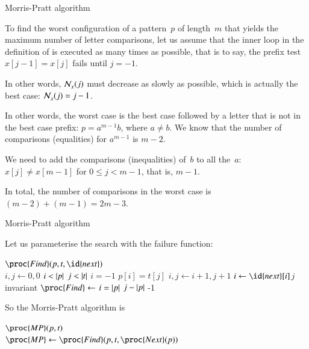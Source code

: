 %
\begin{frame}{Morris-Pratt algorithm}

  To find the worst configuration of a pattern~\(p\) of length~\(m\)
  that yields the maximum number of letter comparisons, let us assume
  that the inner loop in the definition of  is executed as
  many times as possible, that is to say, the prefix test \(x[j-1] =
  x[j]\) fails until \(j = -1\).

  \bigskip

  In other words, \(\mathcal{N}_{x}^{}(j)\) must decrease as slowly as
  possible, which is actually the best case: \(\mathcal{N}_{x}^{}(j) = j
  - 1\).

  \bigskip

  In other words, the worst case is the best case followed by a letter
  that is not in the best case prefix: \(p = a^{m-1}b\), where \(a
  \neq b\). We know that the number of comparisons (equalities) for \(a^{m-1}\) is \(m-2\).

  \bigskip

  We need to add the comparisons (inequalities) of~\(b\) to all
  the~\(a\): \(x[j] \neq x[m-1]\) for \(0 \leqslant j < m - 1\), that
  is, \(m - 1\).

  \bigskip

  In total, the number of comparisons in the worst case is
  \((m-2)+(m-1) = 2m-3\).

\end{frame}

%
\begin{frame}{Morris-Pratt algorithm}

Let us parameterise the search with the failure function:
\begin{codebox}
\(\proc{Find} (p, t, \id{next})\)\\
\li \(i, j \gets 0, 0\)
\li \While \(i < \left\lvert\smash{p}\right\rvert\) \LogAnd \(j < \left\lvert\smash{t}\right\rvert\) 
\li \> \If \(i = -1\) \LogOr \(p[i] = t[j]\)
\li    \Then \(i, j \gets i + 1, j + 1\)
\li    \Else \(i \gets \id{next}[i]\)\RComment \(j\) invariant
       \End
\li \(\proc{Find} \gets\)  \(i = \left\lvert\smash{p}\right\rvert\)  \(j - \left\lvert\smash{p}\right\rvert\)  -1
\End
\end{codebox}

So the Morris-Pratt algorithm is

\begin{codebox}
\(\proc{MP} (p, t)\)\\
\li \(\proc{MP} \gets \proc{Find}(p,t,\proc{Next}(p))\)
\end{codebox}

\end{frame}
